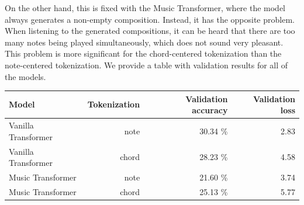 On the other hand, this is fixed with the Music Transformer, where the model always generates a non-empty composition.
Instead, it has the opposite problem.
When listening to the generated compositions, it can be heard that there are too many notes being played simultaneously, which does not sound very pleasant.
This problem is more significant for the chord-centered tokenization than the note-centered tokenization.
We provide a table with validation results for all of the models.

\begin{center}
    \begin{tabular}{|l|r|r|r|}
        \hline
        \textbf{Model}      & \textbf{Tokenization} & \textbf{Validation accuracy} & \textbf{Validation loss} \\
        \hline
        Vanilla Transformer & note                  & 30.34 \%                     & 2.83                     \\
        \hline
        Vanilla Transformer & chord                 & 28.23 \%                     & 4.58                     \\
        \hline
        Music Transformer   & note                  & 21.60 \%                     & 3.74                     \\
        \hline
        Music Transformer   & chord                 & 25.13 \%                     & 5.77                     \\
        \hline
    \end{tabular}
\end{center}